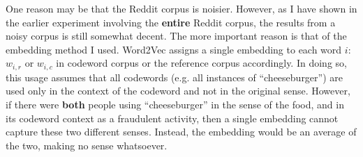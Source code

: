 One reason may be that the Reddit corpus is noisier. However, as I have shown in the earlier experiment involving the \textbf{entire} Reddit corpus, the results from a noisy corpus is still somewhat decent. The more important reason is that of the embedding method I used. Word2Vec assigns a single embedding to each word $i$: $w_{i, r}$ or $w_{i, c}$ in codeword corpus or the reference corpus accordingly. In doing so, this usage assumes that all codewords (e.g. all instances of ``cheeseburger'') are used only in the context of the codeword and not in the original sense. However, if there were \textbf{both} people using ``cheeseburger'' in the sense of the food, and in its codeword context as a fraudulent activity, then a single embedding cannot capture these two different senses. Instead, the embedding would be an average of the two, making no sense whatsoever.

